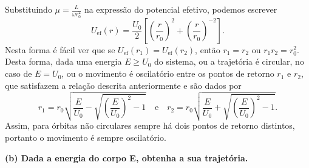 Substituindo \(\mu = \frac{L}{\omega r_0^2}\) na expressão do potencial efetivo, podemos escrever
\begin{equation}
    U_\mathrm{ef}(r) = \frac{U_0}{2}\left[\left(\frac{r}{r_0}\right)^2 + \left(\frac{r}{r_0}\right)^{-2}\right].
\end{equation}
Nesta forma é fácil ver que se \(U_\mathrm{ef}(r_1) = U_\mathrm{ef}(r_2)\), então \(r_1 = r_2\) ou \(r_1r_2 = r_0^2\). Desta forma, dada uma energia \(E \geq U_0\) do sistema, ou a trajetória é circular, no caso de \(E = U_0\), ou o movimento é oscilatório entre os pontos de retorno \(r_1\) e \(r_2\), que satisfazem a relação descrita anteriormente e são dados por
\begin{equation}
    r_1 = r_0\sqrt{\frac{E}{U_0} - \sqrt{\left(\frac{E}{U_0}\right)^2 - 1}}\quad\text{e}\quad r_2 = r_0\sqrt{\frac{E}{U_0} + \sqrt{\left(\frac{E}{U_0}\right)^2 - 1}}.
\end{equation}
Assim, para órbitas não circulares sempre há dois pontos de retorno distintos, portanto o movimento é sempre oscilatório.

\textbf{(b) Dada a energia do corpo E, obtenha a sua trajetória.}

